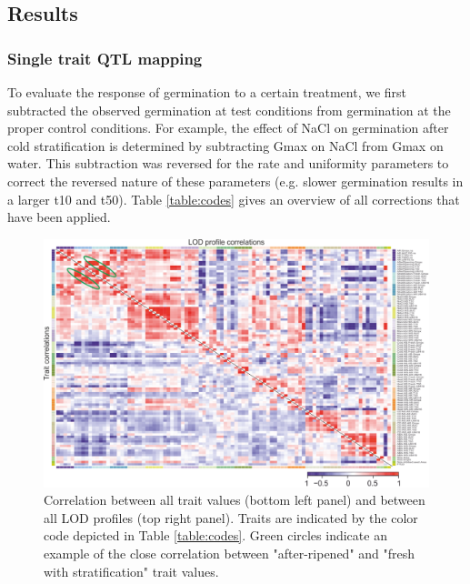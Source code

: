 \subsection{Results}

\subsubsection{Single trait QTL mapping}
To evaluate the response of germination to a certain treatment, we first subtracted the observed 
germination at test conditions from germination at the proper control conditions. For example, the 
effect of NaCl on germination after cold stratification is determined by subtracting Gmax on 
NaCl from Gmax on water. This subtraction was reversed for the rate and uniformity parameters to 
correct the reversed nature of these parameters (e.g. slower germination results in a larger t10 
and t50). Table \ref{table:codes} gives an overview of all corrections that have been applied. 

\begin{figure}[h!]
  \centering
  \includegraphics[keepaspectratio,scale=0.30]{eps/image_3_1_3.eps}
  \caption[Heatmap of correlation.]{Correlation between all trait values (bottom left panel) and between 
          all LOD profiles (top right panel). Traits are indicated by the color code depicted in Table \ref{table:codes}. 
          Green circles indicate an example of the close correlation between "after-ripened" and "fresh 
          with stratification" trait values.}
\end{figure}

